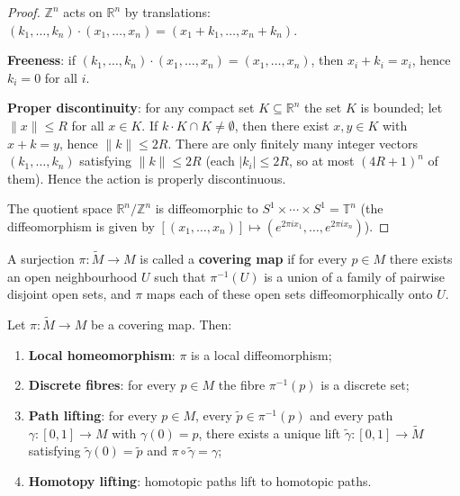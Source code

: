 \begin{proof}
$\mathbb{Z}^n$ acts on $\mathbb{R}^n$ by translations: $(k_1, \dots, k_n) \cdot (x_1, \dots, x_n) = (x_1 + k_1, \dots, x_n + k_n)$.

\textbf{Freeness}: if $(k_1,\dots,k_n)\cdot(x_1,\dots,x_n) = (x_1,\dots,x_n)$, then $x_i + k_i = x_i$, hence $k_i = 0$ for all $i$.

\textbf{Proper discontinuity}: for any compact set $K \subseteq \mathbb{R}^n$ the set $K$ is bounded; let $\|x\| \le R$ for all $x \in K$. If $k \cdot K \cap K \neq \emptyset$, then there exist $x, y \in K$ with $x + k = y$, hence $\|k\| \le 2R$. There are only finitely many integer vectors $(k_1, \dots, k_n)$ satisfying $\|k\| \le 2R$ (each $|k_i| \le 2R$, so at most $(4R+1)^n$ of them). Hence the action is properly discontinuous.

The quotient space $\mathbb{R}^n/\mathbb{Z}^n$ is diffeomorphic to $S^1 \times \cdots \times S^1 = \mathbb{T}^n$ (the diffeomorphism is given by $[(x_1, \dots, x_n)] \mapsto (e^{2\pi i x_1}, \dots, e^{2\pi i x_n})$).
\end{proof}

\begin{definition}\label{def:covering_space}
A surjection $\pi: \tilde{M} \to M$ is called a \textbf{covering map} if for every $p \in M$ there exists an open neighbourhood $U$ such that $\pi^{-1}(U)$ is a union of a family of pairwise disjoint open sets, and $\pi$ maps each of these open sets diffeomorphically onto $U$.
\end{definition}

\begin{lemma}\label{lem:covering_properties}
Let $\pi: \tilde{M} \to M$ be a covering map. Then:
\begin{enumerate}[label=(\roman*)]
    \item \textbf{Local homeomorphism}: $\pi$ is a local diffeomorphism;
    \item \textbf{Discrete fibres}: for every $p \in M$ the fibre $\pi^{-1}(p)$ is a discrete set;
    \item \textbf{Path lifting}: for every $p \in M$, every $\tilde{p} \in \pi^{-1}(p)$ and every path $\gamma: [0,1] \to M$ with $\gamma(0) = p$, there exists a unique lift $\tilde{\gamma}: [0,1] \to \tilde{M}$ satisfying $\tilde{\gamma}(0) = \tilde{p}$ and $\pi \circ \tilde{\gamma} = \gamma$;
    \item \textbf{Homotopy lifting}: homotopic paths lift to homotopic paths.
\end{enumerate}
\end{lemma}

